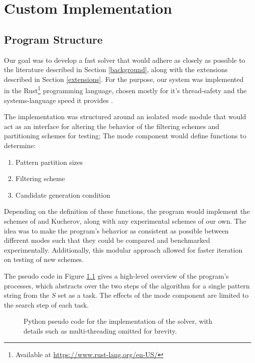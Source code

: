 \chapter{Custom Implementation}

\section{Program Structure}
\label{structure}

Our goal was to develop a fast \aspop{} solver that would adhere as closely as possible to the literature described in Section \ref{background}, along with the extensions described in Section \ref{extensions}. For the purpose, our system was implemented in the Rust\footnote{Available at \url{https://www.rust-lang.org/en-US/}} programming language, chosen mostly for it's thread-safety and the systems-language speed it provides \cite{rustlang}.

The implementation was structured around an isolated \textit{mode} module that would act as an interface for altering the behavior of the \glspl{filtering scheme} and \glspl{partitioning scheme} for testing; The mode component would define functions to determine:
\begin{enumerate}
\item Pattern partition sizes
\item Filtering scheme
\item Candidate generation condition
\end{enumerate}

Depending on the definition of these functions, the program would implement the schemes of \vali{} and Kucherov, along with any experimental schemes of our own. The idea was to make the program’s behavior as consistent as possible between different modes such that they could be compared and benchmarked experimentally. Additionally, this modular approach allowed for faster iteration on testing of new schemes.
 
The pseudo code in Figure \ref{fig:pseudocode} gives a high-level overview of the program’s processes, which abstracts over the two steps of the algorithm for a single pattern string from the $S$ set as a task. The effects of the mode component are limited to the \gls{search step} of each \gls{task}.

\begin{figure}[!htb]
\centering
{}
\caption[Python pseudo code for the implementation of the \aspop{} solver.]{Python pseudo code for the implementation of the \aspop{} solver, with details such as multi-threading omitted for brevity.}
\label{fig:pseudocode}
\end{figure}












